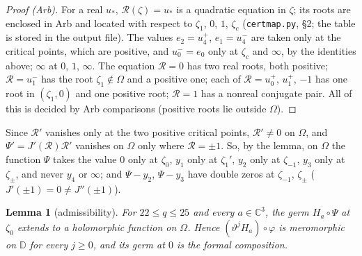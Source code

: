 \documentclass[11pt]{amsart}
\newtheorem{lemma}[proposition]{Lemma}
\theoremstyle{definition}
\theoremstyle{remark}
\numberwithin{equation}{section}
\newcommand{\CC}{\mathbb{C}}
\newcommand{\DD}{\mathbb{D}}
\newcommand{\file}[1]{{\def\_{\textunderscore\allowbreak}\texttt{#1}}}
\begin{document}
\begin{proof}[Proof (Arb)]
For a real $u_*$, $\mathcal R(\zeta)=u_*$ is a quadratic equation in $\zeta$; its roots are enclosed in Arb and located with
respect to $\zeta_1$, $0$, $1$, $\zeta_c$ (\file{cert\_map.py}, \S2; the table is stored in the output file). The values
$e_2=u_4^+$, $e_1=u_4^-$ are taken only at the critical points, which are positive, and $u_0^-=e_0$ only at $\zeta_c$ and
$\infty$, by the identities above; $\infty$ at $0$, $1$, $\infty$. The equation $\mathcal R=0$ has two real roots, both
positive; $\mathcal R=u_1^-$ has the root $\zeta_1\notin\Omega$ and a positive one; each of $\mathcal R=u_0^+$, $u_1^+$, $-1$
has one root in $(\zeta_1,0)$ and one positive root; $\mathcal R=1$ has a nonreal conjugate pair. All of this is decided
by Arb comparisons (positive roots lie outside $\Omega$).
\end{proof}

Since $\mathcal R'$ vanishes only at the two positive critical points, $\mathcal R'\ne0$ on $\Omega$, and $\Psi'=J'(\mathcal
R)\mathcal R'$ vanishes on $\Omega$ only where $\mathcal R=\pm1$. So, by the lemma, on $\Omega$ the function $\Psi$ takes the
value $0$ only at $\zeta_0$, $y_1$ only at $\zeta_1'$, $y_2$ only at $\zeta_{-1}$, $y_3$ only at $\zeta_\pm$, and never
$y_4$ or $\infty$; and $\Psi-y_2$, $\Psi-y_3$ have double zeros at $\zeta_{-1}$, $\zeta_\pm$ ($J'(\pm1)=0\ne J''(\pm1)$).

\begin{lemma}[admissibility]\label{lem:Kadm}
For $22\le q\le25$ and every $a\in\CC^3$, the germ $H_a\circ\Psi$ at $\zeta_0$ extends to a holomorphic function on
$\Omega$. Hence $(\vartheta^jH_a)\circ\varphi$ is meromorphic on $\DD$ for every $j\ge0$, and its germ at $0$ is the formal
composition.
\end{lemma}
\end{document}
